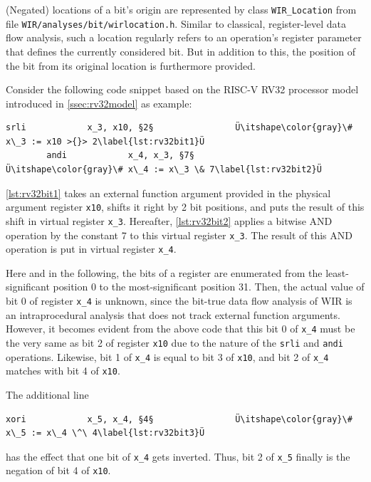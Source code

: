 (Negated) locations of a bit's origin are represented by class \texttt{WIR\_Location} from file \texttt{WIR/analyses/bit/wir\-location.h}.
Similar to classical, register-level data flow analysis, such a location regularly refers to an operation's register parameter that defines the currently considered bit.
But in addition to this, the position of the bit from its original location is furthermore provided.

\begin{wirExample}\label{ex:bit}
Consider the following code snippet based on the RISC-V RV32 processor model introduced in \cref{ssec:rv32model} as example:
\begin{lstlisting}[style=code]
        srli            x_3, x10, §2§                Ü\itshape\color{gray}\# x\_3 := x10 >{}> 2\label{lst:rv32bit1}Ü
        andi            x_4, x_3, §7§                Ü\itshape\color{gray}\# x\_4 := x\_3 \& 7\label{lst:rv32bit2}Ü
\end{lstlisting}
\cref{lst:rv32bit1} takes an external function argument provided in the physical argument register \texttt{x10}, shifts it right by 2 bit positions, and puts the result of this shift in virtual register \texttt{x\_3}.
Hereafter, \cref{lst:rv32bit2} applies a bitwise AND operation by the constant 7 to this virtual register \texttt{x\_3}.
The result of this AND operation is put in virtual register \texttt{x\_4}.

Here and in the following, the bits of a register are enumerated from the least-significant position 0 to the most-significant position 31.
Then, the actual value of bit 0 of register \texttt{x\_4} is unknown, since the bit-true data flow analysis of \gls{WIR} is an intraprocedural analysis that does not track external function arguments.
However, it becomes evident from the above code that this bit 0 of \texttt{x\_4} must be the very same as bit 2 of register \texttt{x10} due to the nature of the \texttt{srli} and \texttt{andi} operations.
Likewise, bit 1 of \texttt{x\_4} is equal to bit 3 of \texttt{x10}, and bit 2 of \texttt{x\_4} matches with bit 4 of \texttt{x10}.

The additional line
\begin{lstlisting}[style=code,firstnumber=3]
        xori            x_5, x_4, §4§                Ü\itshape\color{gray}\# x\_5 := x\_4 \^\ 4\label{lst:rv32bit3}Ü
\end{lstlisting}
has the effect that one bit of \texttt{x\_4} gets inverted.
Thus, bit 2 of \texttt{x\_5} finally is the negation of bit 4 of \texttt{x10}.
\end{wirExample}

